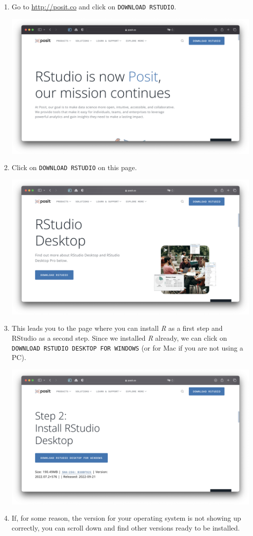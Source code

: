 \documentclass[
  letterpaper,
]{krantz}
\begin{document}
\begin{enumerate}
\def\labelenumi{\arabic{enumi}.}
\item
  Go to \url{http://posit.co} and click on \texttt{DOWNLOAD\ RSTUDIO}.

  \includegraphics{images/chapter_03_img/rstudio/01_posit_main_page.png}
\item
  Click on \texttt{DOWNLOAD\ RSTUDIO} on this page.

  \includegraphics{images/chapter_03_img/rstudio/02_posit_rstudio_desktop.png}
\item
  This leads you to the page where you can install \emph{R} as a first
  step and RStudio as a second step. Since we installed \emph{R}
  already, we can click on
  \texttt{DOWNLOAD\ RSTUDIO\ DESKTOP\ FOR\ WINDOWS} (or for Mac if you
  are not using a PC).

  \includegraphics{images/chapter_03_img/rstudio/03_posit_installer.png}
\item
  If, for some reason, the version for your operating system is not
  showing up correctly, you can scroll down and find other versions
  ready to be installed.


\end{enumerate}
\end{document}
